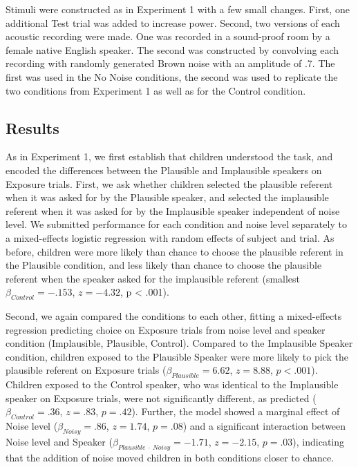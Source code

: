 \documentclass[man,floatsintext]{apa6}
\begin{document}
Stimuli were constructed as in Experiment 1 with a few small changes. First, one additional Test trial was added to increase power. Second, two versions of each acoustic recording were made. One was recorded in a sound-proof room by a female native English speaker. The second was constructed by convolving each recording with randomly generated Brown noise with an amplitude of .7. The first was used in the No Noise conditions, the second was used to replicate the two conditions from Experiment 1 as well as for the Control condition.

\subsection{Results}

As in Experiment 1, we first establish that children understood the task, and encoded the differences between the Plausible and Implausible speakers on Exposure trials. First, we ask whether children selected the plausible referent when it was asked for by the Plausible speaker, and selected the implausible referent when it was asked for by the Implausible speaker independent of noise level. We submitted performance for each condition and noise level separately to a mixed-effects logistic regression with random effects of subject and trial. As before, children were more likely than chance to choose the plausible referent in the Plausible condition, and less likely than chance to choose the plausible referent when the speaker asked for the implausible referent (smallest $\beta_{Control} = -.153$, $z = -4.32$, p < .001). 

Second, we again compared the conditions to each other, fitting a mixed-effects regression predicting choice on Exposure trials from noise level and speaker condition (Implausible, Plausible, Control). Compared to the Implausible Speaker condition, children exposed to the Plausible Speaker were more likely to pick the plausible referent on Exposure trials ($\beta_{Plausible} = 6.62$,  $z = 8.88$, $p <.001$). Children exposed to the Control speaker, who was identical to the Implausible speaker on Exposure trials, were not significantly different, as predicted ($\beta_{Control} = .36$,  $z = .83$, $p = .42$). Further, the model showed a marginal effect of Noise level ($\beta_{Noisy} = .86$,  $z = 1.74$, $p = .08$) and a significant interaction between Noise level and Speaker ($\beta_{Plausible \: \cdot \: Noisy} = -1.71$, $z= -2.15$, $p = .03$), indicating that the addition of noise moved children in both conditions closer to chance.
\end{document}
